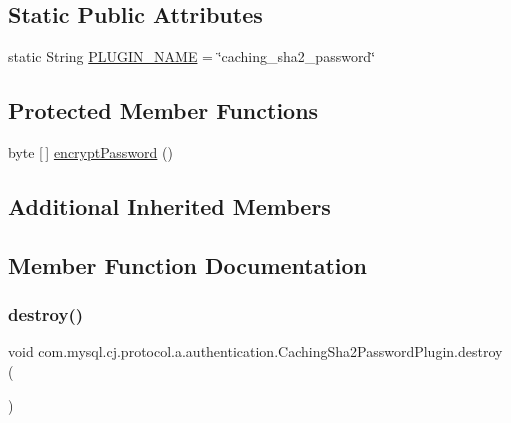 \subsection*{Static Public Attributes}
\begin{DoxyCompactItemize}
\item 
static String \mbox{\hyperlink{classcom_1_1mysql_1_1cj_1_1protocol_1_1a_1_1authentication_1_1_caching_sha2_password_plugin_aa7f4c70496cc6da39887f311423d086c}{P\+L\+U\+G\+I\+N\+\_\+\+N\+A\+ME}} = \char`\"{}caching\+\_\+sha2\+\_\+password\char`\"{}
\end{DoxyCompactItemize}
\subsection*{Protected Member Functions}
\begin{DoxyCompactItemize}
\item 
byte \mbox{[}$\,$\mbox{]} \mbox{\hyperlink{classcom_1_1mysql_1_1cj_1_1protocol_1_1a_1_1authentication_1_1_caching_sha2_password_plugin_a805d910174ec1cd3fba30624ff667e72}{encrypt\+Password}} ()
\end{DoxyCompactItemize}
\subsection*{Additional Inherited Members}


\subsection{Member Function Documentation}
\mbox{\label{classcom_1_1mysql_1_1cj_1_1protocol_1_1a_1_1authentication_1_1_caching_sha2_password_plugin_ae1487e57db91585f60ffa884c6f10a54}} 
\subsubsection{\texorpdfstring{destroy()}{destroy()}}
{\footnotesize\ttfamily void com.\+mysql.\+cj.\+protocol.\+a.\+authentication.\+Caching\+Sha2\+Password\+Plugin.\+destroy (\begin{DoxyParamCaption}{ }\end{DoxyParamCaption})}

